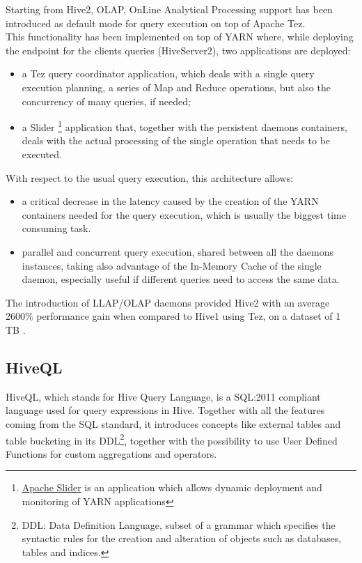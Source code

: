 Starting from Hive2, OLAP, OnLine Analytical Processing support has been introduced as default mode for query execution on top of Apache Tez.\\  
This functionality has been implemented on top of YARN where, while deploying the endpoint for the clients queries (HiveServer2), two applications are deployed: 

\begin{itemize}
    \item a Tez query coordinator application, which deals with a single query execution planning, a series of Map and Reduce operations, but also the concurrency of many queries, if needed;
    \item a Slider \footnote{\href{https://slider.incubator.apache.org/}{Apache Slider} is an application which allows dynamic deployment and monitoring of YARN applications} application that, together with the persistent daemons containers, deals with the actual processing of the single operation that needs to be executed.
\end{itemize}

With respect to the usual query execution, this architecture allows:

\begin{itemize} 
	\item a critical decrease in the latency caused by the creation of the YARN containers needed for the query execution, which is usually the biggest time consuming task.
	\item parallel and concurrent query execution, shared between all the daemons instances, taking also advantage of the In-Memory Cache of the single daemon, especially useful if different queries need to access the same data.
\end{itemize}

The introduction of LLAP/OLAP daemons provided Hive2 with an average 2600\% performance gain when compared to Hive1 using Tez, on a dataset of 1 TB \cite{hive2_on_tez}.

\subsection{HiveQL}

HiveQL, which stands for Hive Query Language, is a SQL:2011 compliant language used for query expressions in Hive. Together with all the features coming from the SQL standard, it introduces concepts like external tables and table bucketing in its DDL\footnote{DDL: Data Definition Language, subset of a grammar which specifies the syntactic rules for the creation and alteration of objects such as databases, tables and indices.}, together with the possibility to use User Defined Functions for custom aggregations and operators.

